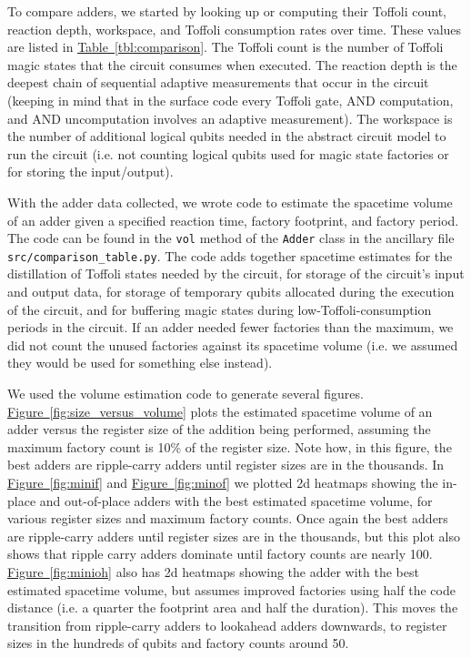 \documentclass[onecolumn,unpublished]{quantumarticle}
\theoremstyle{definition}
\theoremstyle{definition}
\theoremstyle{definition}
\newcommand{\fig}[1]{\hyperref[fig:#1]{Figure~\ref*{fig:#1}}}
\newcommand{\tbl}[1]{\hyperref[tbl:#1]{Table~\ref*{tbl:#1}}}
\begin{document}
To compare adders, we started by looking up or computing their Toffoli count, reaction depth, workspace, and Toffoli consumption rates over time.
These values are listed in \tbl{comparison}.
The Toffoli count is the number of Toffoli magic states that the circuit consumes when executed.
The reaction depth is the deepest chain of sequential adaptive measurements that occur in the circuit (keeping in mind that in the surface code every Toffoli gate, AND computation, and AND uncomputation involves an adaptive measurement).
The workspace is the number of additional logical qubits needed in the abstract circuit model to run the circuit (i.e. not counting logical qubits used for magic state factories or for storing the input/output).

With the adder data collected, we wrote code to estimate the spacetime volume of an adder given a specified reaction time, factory footprint, and factory period.
The code can be found in the \texttt{vol} method of the \texttt{Adder} class in the ancillary file \texttt{src/comparison\_table.py}.
The code adds together spacetime estimates for the distillation of Toffoli states needed by the circuit, for storage of the circuit's input and output data, for storage of temporary qubits allocated during the execution of the circuit, and for buffering magic states during low-Toffoli-consumption periods in the circuit.
If an adder needed fewer factories than the maximum, we did not count the unused factories against its spacetime volume (i.e. we assumed they would be used for something else instead).

We used the volume estimation code to generate several figures.
\fig{size_versus_volume} plots the estimated spacetime volume of an adder versus the register size of the addition being performed, assuming the maximum factory count is 10\% of the register size.
Note how, in this figure, the best adders are ripple-carry adders until register sizes are in the thousands.
In \fig{minif} and \fig{minof} we plotted 2d heatmaps showing the in-place and out-of-place adders with the best estimated spacetime volume, for various register sizes and maximum factory counts.
Once again the best adders are ripple-carry adders until register sizes are in the thousands, but this plot also shows that ripple carry adders dominate until factory counts are nearly 100.
\fig{minioh} also has 2d heatmaps showing the adder with the best estimated spacetime volume, but assumes improved factories using half the code distance (i.e. a quarter the footprint area and half the duration).
This moves the transition from ripple-carry adders to lookahead adders downwards, to register sizes in the hundreds of qubits and factory counts around 50.
\end{document}
